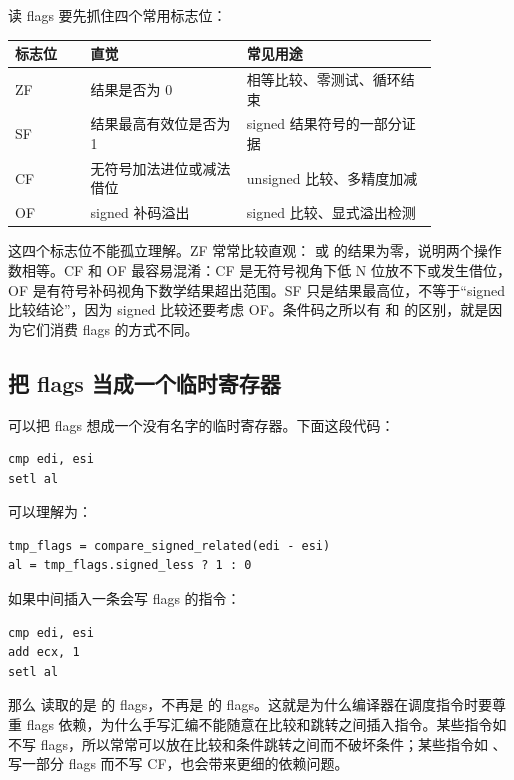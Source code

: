 读 flags 要先抓住四个常用标志位：

\begin{center}
\begin{tabular}{p{0.15\linewidth}p{0.31\linewidth}p{0.38\linewidth}}
\toprule
标志位 & 直觉 & 常见用途 \\
\midrule
ZF & 结果是否为 0 & 相等比较、零测试、循环结束 \\
SF & 结果最高有效位是否为 1 & signed 结果符号的一部分证据 \\
CF & 无符号加法进位或减法借位 & unsigned 比较、多精度加减 \\
OF & signed 补码溢出 & signed 比较、显式溢出检测 \\
\bottomrule
\end{tabular}
\end{center}

这四个标志位不能孤立理解。ZF 常常比较直观： 或  的结果为零，说明两个操作数相等。CF 和 OF 最容易混淆：CF 是无符号视角下低 N 位放不下或发生借位，OF 是有符号补码视角下数学结果超出范围。SF 只是结果最高位，不等于“signed 比较结论”，因为 signed 比较还要考虑 OF。条件码之所以有  和  的区别，就是因为它们消费 flags 的方式不同。

\subsection{把 flags 当成一个临时寄存器}

可以把 flags 想成一个没有名字的临时寄存器。下面这段代码：

\begin{lstlisting}
cmp edi, esi
setl al
\end{lstlisting}

可以理解为：

\begin{lstlisting}
tmp_flags = compare_signed_related(edi - esi)
al = tmp_flags.signed_less ? 1 : 0
\end{lstlisting}

如果中间插入一条会写 flags 的指令：

\begin{lstlisting}
cmp edi, esi
add ecx, 1
setl al
\end{lstlisting}

那么  读取的是  的 flags，不再是  的 flags。这就是为什么编译器在调度指令时要尊重 flags 依赖，为什么手写汇编不能随意在比较和跳转之间插入指令。某些指令如  不写 flags，所以常常可以放在比较和条件跳转之间而不破坏条件；某些指令如 、 写一部分 flags 而不写 CF，也会带来更细的依赖问题。


